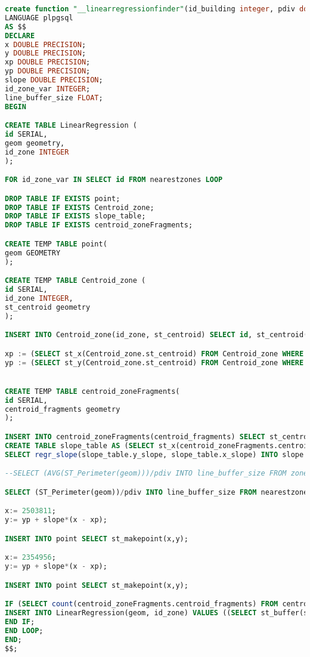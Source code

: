 \begin{lstlisting}[language=SQL]
create function "__linearregressionfinder"(id_building integer, pdiv double precision) returns void
LANGUAGE plpgsql
AS $$
DECLARE
x DOUBLE PRECISION;
y DOUBLE PRECISION;
xp DOUBLE PRECISION;
yp DOUBLE PRECISION;
slope DOUBLE PRECISION;
id_zone_var INTEGER;
line_buffer_size FLOAT;
BEGIN

CREATE TABLE LinearRegression (
id SERIAL,
geom geometry,
id_zone INTEGER
);

FOR id_zone_var IN SELECT id FROM nearestzones LOOP

DROP TABLE IF EXISTS point;
DROP TABLE IF EXISTS Centroid_zone;
DROP TABLE IF EXISTS slope_table;
DROP TABLE IF EXISTS centroid_zoneFragments;

CREATE TEMP TABLE point(
geom GEOMETRY
);

CREATE TEMP TABLE Centroid_zone (
id SERIAL,
id_zone INTEGER,
st_centroid geometry
);

INSERT INTO Centroid_zone(id_zone, st_centroid) SELECT id, st_centroid(nearestzones.geom) FROM nearestzones;

xp := (SELECT st_x(Centroid_zone.st_centroid) FROM Centroid_zone WHERE Centroid_zone.id_zone = id_zone_var);
yp := (SELECT st_y(Centroid_zone.st_centroid) FROM Centroid_zone WHERE Centroid_zone.id_zone = id_zone_var);


CREATE TEMP TABLE centroid_zoneFragments(
id SERIAL,
centroid_fragments geometry
);

INSERT INTO centroid_zoneFragments(centroid_fragments) SELECT st_centroid(geom) FROM zonefragments WHERE id_zone = id_zone_var;
CREATE TABLE slope_table AS (SELECT st_x(centroid_zoneFragments.centroid_fragments) as x_slope , st_y(centroid_zoneFragments.centroid_fragments) AS y_slope FROM centroid_zoneFragments);
SELECT regr_slope(slope_table.y_slope, slope_table.x_slope) INTO slope FROM slope_table;

--SELECT (AVG(ST_Perimeter(geom)))/pdiv INTO line_buffer_size FROM zonefragments WHERE id_zone = id_zone_var;

SELECT (ST_Perimeter(geom))/pdiv INTO line_buffer_size FROM nearestzones WHERE id = id_zone_var;

x:= 2503811;
y:= yp + slope*(x - xp);

INSERT INTO point SELECT st_makepoint(x,y);

x:= 2354956;
y:= yp + slope*(x - xp);

INSERT INTO point SELECT st_makepoint(x,y);

IF (SELECT count(centroid_zoneFragments.centroid_fragments) FROM centroid_zoneFragments) > 3 THEN
INSERT INTO LinearRegression(geom, id_zone) VALUES ((SELECT st_buffer(st_makeline(st_setsrid(point.geom,3004)), line_buffer_size) FROM point), id_zone_var);
END IF;
END LOOP;
END;
$$;
\end{lstlisting}

